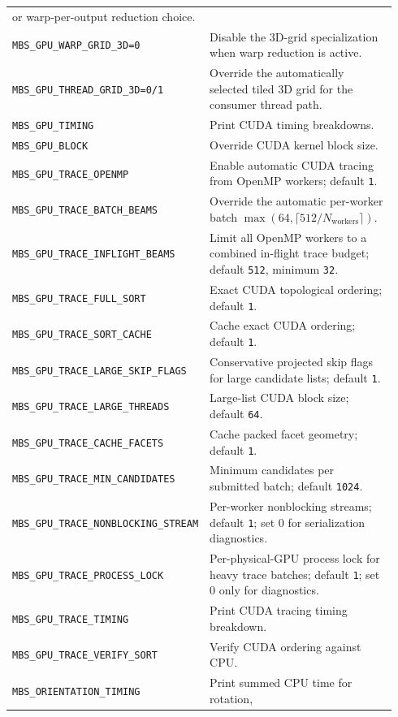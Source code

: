 \documentclass[
  10pt,
  a4paper,
]{article}
\begin{document}
\begin{longtable}[]{@{}L{0.30\linewidth}L{0.64\linewidth}@{}}
or warp-per-output reduction choice. \\
\texttt{MBS\_GPU\_WARP\_GRID\_3D=0} & Disable the 3D-grid specialization when
warp reduction is active. \\
\texttt{MBS\_GPU\_THREAD\_GRID\_3D=0/1} & Override the automatically selected
tiled 3D grid for the consumer thread path. \\
\texttt{MBS\_GPU\_TIMING} & Print CUDA timing breakdowns. \\
\texttt{MBS\_GPU\_BLOCK} & Override CUDA kernel block size. \\
\nolinkurl{MBS_GPU_TRACE_OPENMP} & Enable automatic CUDA tracing from
OpenMP workers; default \texttt{1}. \\
\nolinkurl{MBS_GPU_TRACE_BATCH_BEAMS} & Override the automatic per-worker
batch $\max(64,\lceil512/N_{\mathrm{workers}}\rceil)$. \\
\nolinkurl{MBS_GPU_TRACE_INFLIGHT_BEAMS} & Limit all OpenMP workers to a
combined in-flight trace budget; default \texttt{512}, minimum \texttt{32}. \\
\nolinkurl{MBS_GPU_TRACE_FULL_SORT} & Exact CUDA topological ordering;
default \texttt{1}. \\
\nolinkurl{MBS_GPU_TRACE_SORT_CACHE} & Cache exact CUDA ordering; default
\texttt{1}. \\
\nolinkurl{MBS_GPU_TRACE_LARGE_SKIP_FLAGS} & Conservative projected skip
flags for large candidate lists; default \texttt{1}. \\
\nolinkurl{MBS_GPU_TRACE_LARGE_THREADS} & Large-list CUDA block size;
default \texttt{64}. \\
\nolinkurl{MBS_GPU_TRACE_CACHE_FACETS} & Cache packed facet geometry;
default \texttt{1}. \\
\nolinkurl{MBS_GPU_TRACE_MIN_CANDIDATES} & Minimum candidates per submitted
batch; default \texttt{1024}. \\
\nolinkurl{MBS_GPU_TRACE_NONBLOCKING_STREAM} & Per-worker nonblocking streams;
default \texttt{1}; set 0 for serialization diagnostics. \\
\nolinkurl{MBS_GPU_TRACE_PROCESS_LOCK} & Per-physical-GPU process lock for
heavy trace batches; default \texttt{1}; set 0 only for diagnostics. \\
\nolinkurl{MBS_GPU_TRACE_TIMING} & Print CUDA tracing timing breakdown. \\
\nolinkurl{MBS_GPU_TRACE_VERIFY_SORT} & Verify CUDA ordering against CPU. \\
\texttt{MBS\_ORIENTATION\_TIMING} & Print summed CPU time for rotation,

\end{longtable}
\end{document}
